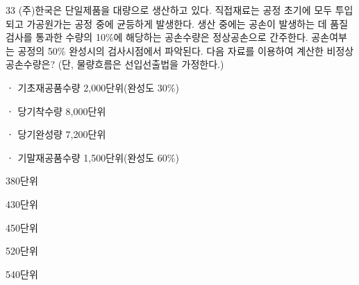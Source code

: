 \begin{question}{33}
(주)한국은 단일제품을 대량으로 생산하고 있다. 직접재료는 공정 초기에 모두 투입되고 가공원가는 공정 중에 균등하게 발생한다. 생산 중에는 공손이 발생하는 데 품질검사를 통과한 수량의 10\%에 해당하는 공손수량은 정상공손으로 간주한다. 공손여부는 공정의 50\% 완성시의 검사시점에서 파악된다. 다음 자료를 이용하여 계산한 비정상공손수량은? (단, 물량흐름은 선입선출법을 가정한다.)
\begin{framedtext}
ㆍ 기초재공품수량 2,000단위(완성도 30\%) \par
ㆍ 당기착수량 8,000단위 \par
ㆍ 당기완성량 7,200단위 \par
ㆍ 기말재공품수량 1,500단위(완성도 60\%) \par
\end{framedtext}
\begin{choices}
  \item 380단위
  \item 430단위
  \item 450단위
  \item 520단위
  \item 540단위
\end{choices}
\end{question}
